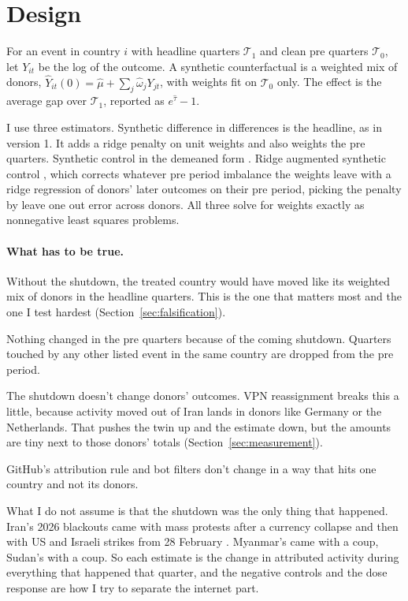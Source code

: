 \documentclass[11pt]{article}
\begin{document}
\section{Design}
\label{sec:design}

For an event in country $i$ with headline quarters $\mathcal{T}_1$ and clean pre quarters $\mathcal{T}_0$, let $Y_{it}$ be the log of the outcome. A synthetic counterfactual is a weighted mix of donors, $\hat Y_{it}(0) = \hat\mu + \sum_j \hat\omega_j Y_{jt}$, with weights fit on $\mathcal{T}_0$ only. The effect is the average gap over $\mathcal{T}_1$, reported as $e^{\hat\tau}-1$.

I use three estimators. Synthetic difference in differences \citep{arkhangelsky2021} is the headline, as in version 1. It adds a ridge penalty on unit weights and also weights the pre quarters. Synthetic control \citep{abadie2010} in the demeaned form \citep{fermanpinto2021}. Ridge augmented synthetic control \citep{benmichael2021}, which corrects whatever pre period imbalance the weights leave with a ridge regression of donors' later outcomes on their pre period, picking the penalty by leave one out error across donors. All three solve for weights exactly as nonnegative least squares problems.

\paragraph{What has to be true.}
\begin{description}[style=unboxed,leftmargin=0pt]
\item[A1. The twin's path.] Without the shutdown, the treated country would have moved like its weighted mix of donors in the headline quarters. This is the one that matters most and the one I test hardest (Section~\ref{sec:falsification}).
\item[A2. No anticipation.] Nothing changed in the pre quarters because of the coming shutdown. Quarters touched by any other listed event in the same country are dropped from the pre period.
\item[A3. Donors untouched.] The shutdown doesn't change donors' outcomes. VPN reassignment breaks this a little, because activity moved out of Iran lands in donors like Germany or the Netherlands. That pushes the twin up and the estimate down, but the amounts are tiny next to those donors' totals (Section~\ref{sec:measurement}).
\item[A4. Stable measurement.] GitHub's attribution rule and bot filters don't change in a way that hits one country and not its donors.
\end{description}
What I do not assume is that the shutdown was the only thing that happened. Iran's 2026 blackouts came with mass protests after a currency collapse and then with US and Israeli strikes from 28 February \citep{rferl2026, jurist2026}. Myanmar's came with a coup, Sudan's with a coup. So each estimate is the change in attributed activity during everything that happened that quarter, and the negative controls and the dose response are how I try to separate the internet part.
\end{document}
